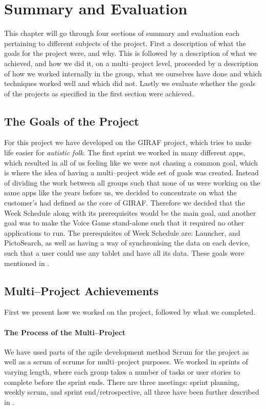 \chapter{Summary and Evaluation}
This chapter will go through four sections of summary and evaluation each pertaining to different subjects of the project.
First a description of what the goals for the project were, and why.
This is followed by a description of what we achieved, and how we did it, on a multi--project level, proceeded by a description of how we worked internally in the group, what we ourselves have done and which techniques worked well and which did not.
Lastly we evaluate whether the goals of the projects as specified in the first section were achieved.

\section{The Goals of the Project}

For this project we have developed on the GIRAF project, which tries to make life easier for \textit{autistic folk}. 
The first sprint we worked in many different apps, which resulted in all of us feeling like we were not chasing a common goal, which is where the idea of having a multi--project wide set of goals was created.
Instead of dividing the work between all groups such that none of us were working on the same apps like the years before us, we decided to concentrate on what the customer's had defined as the core of GIRAF.
Therefore we decided that the Week Schedule along with its prerequisites would be the main goal, and another goal was to make the Voice Game stand-alone such that it required no other applications to run.
The prerequisites of Week Schedule are: Launcher, and PictoSearch, as well as having a way of synchronising the data on each device, such that a user could use any tablet and have all its data.
These goals were mentioned in .

\section{Multi--Project Achievements}
First we present how we worked on the project, followed by what we completed.

\subsubsection*{The Process of the Multi--Project}
We have used parts of the agile development method Scrum for the project as well as a scrum of scrums for multi--project purposes.
We worked in sprints of varying length, where each group takes a number of tasks or user stories to complete before the sprint ends.
There are three meetings: sprint planning, weekly scrum, and sprint end/retrospective, all three have been further described in .

